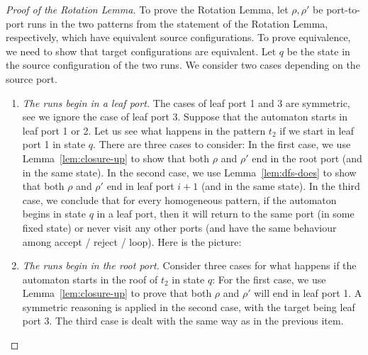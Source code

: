  
 \begin{proof}[Proof of the Rotation Lemma] 

To prove the Rotation Lemma, let  $\rho,\rho'$ be  port-to-port runs in the two patterns 
from the statement of the Rotation Lemma, respectively, which have equivalent source configurations. To prove equivalence, we need to show that  target configurations are equivalent. Let $q$ be the state in the source configuration of the two runs. We consider two cases depending on the source port.
	\begin{enumerate}
		\item \emph{The runs begin in a leaf port.} The cases of leaf port 1 and 3 are symmetric, see we ignore the case of leaf port 3. Suppose that the automaton starts in leaf port 1 or 2. Let us see what happens in the pattern $t_2$ if we start in leaf port 1 in state $q$. There are three cases to consider:
	 In the first case, we use Lemma~\ref{lem:closure-up} to show that both $\rho$ and $\rho'$ end in the root port (and in the same state).
	 In the second case, we use Lemma~\ref{lem:dfs-does} to show that both $\rho$ and $\rho'$ end in leaf port $i+1$ (and in the same state).
 In the third case, we conclude that for every homogeneous pattern, if the automaton begins in state $q$ in a leaf port, then it will return to the same port (in some fixed state) or never visit any other ports (and have the same behaviour among accept / reject / loop). Here is the picture:


	\item \emph{The runs begin in the root port.}  	Consider three cases for what happens if the automaton starts in the roof of $t_2$  in state $q$:
	For the first  case, we use  Lemma~\ref{lem:closure-up} to prove that both $\rho$ and $\rho'$ will end in leaf port 1. A symmetric reasoning is applied in the second case, with the target being leaf port 3. The third case is dealt with the same way as in the previous item.
		\end{enumerate}	

\end{proof}

